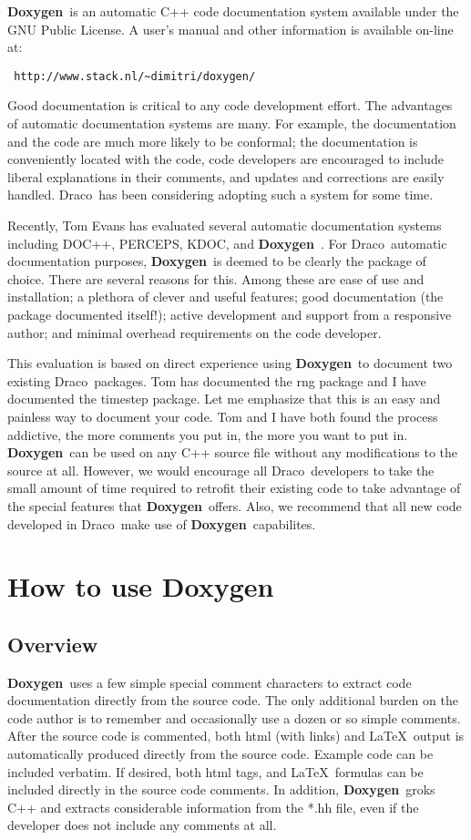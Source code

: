\documentclass[11pt]{nmemo}
\newcommand{\draco}{{\normalfont\sffamily Draco}}
\newcommand{\doxy}{{\normalfont\bfseries Doxygen}}
\begin{document}
\doxy\ is an automatic C++ code documentation system available under
the GNU Public License. 
 A user's manual and other information is available on-line at:
\begin{verbatim} http://www.stack.nl/~dimitri/doxygen/ \end{verbatim}

Good documentation is critical to any code development effort.
The advantages of automatic documentation systems are many. 
For example, the documentation  and the code are much more likely to
be conformal; the documentation is conveniently located with the code,
code developers are encouraged to include liberal explanations in their 
comments, and updates and corrections are easily handled.
\draco\ has been considering adopting such a system for some time.


Recently, Tom Evans has evaluated several automatic documentation systems
including DOC++, PERCEPS, KDOC, and \doxy\ . 
For \draco\ automatic documentation purposes, \doxy\ is deemed to be clearly the 
package of choice. There are several reasons for this. Among these are
ease of use and installation; a plethora of clever and useful features;
good documentation (the package documented itself!);
active development and support from a responsive author; and 
minimal overhead requirements on the code developer.


This evaluation is based on direct experience using \doxy\ to document
two existing \draco\ packages.
Tom has documented the rng package and I have documented the timestep
package.
Let me emphasize that this is an easy and painless way to document your
code. Tom and I have both found the process addictive, the more comments
you put in, the more you want to put in. \doxy\ can be used on any
C++ source file without any modifications to the source at all. However,
we would encourage all \draco\
developers to take the small amount of time required to retrofit their
 existing code
to take advantage of the special features that \doxy\ offers. 
Also, we recommend that all new code developed in \draco\ make use
of \doxy\ capabilites.

\section{How to use \doxy\ }

\subsection{Overview}
\doxy\ uses a few simple special comment characters to extract code
documentation directly from the source code. The only additional burden
on the code author is to remember and occasionally use a dozen or so
simple comments. After the source code is commented, both html (with links)
and \LaTeX\ output is automatically produced directly from the source code.
Example code can be included verbatim. If desired, both  html tags, and \LaTeX\
formulas can be included directly in the source code comments. In addition,
\doxy\ groks C++ and extracts considerable information from the *.hh
file, even if the developer does not include any comments at all.
\end{document}
